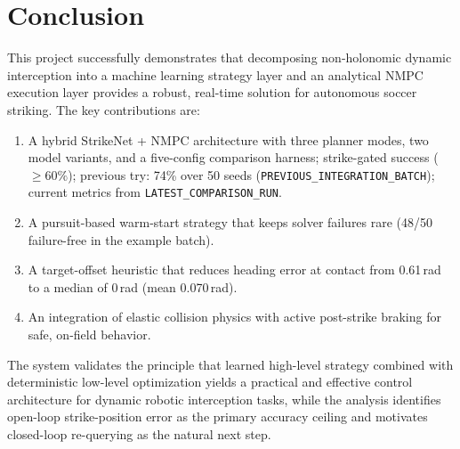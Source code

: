 \documentclass[10pt,twocolumn,letterpaper]{article}
\begin{document}
\section{Conclusion}

This project successfully demonstrates that decomposing non-holonomic
dynamic interception into a machine learning strategy layer and an
analytical NMPC execution layer provides a robust, real-time solution
for autonomous soccer striking. The key contributions are:
\begin{enumerate}
    \item A hybrid StrikeNet + NMPC architecture with three planner modes,
      two model variants, and a five-config comparison harness;
      strike-gated success ($\geq 60\%$); previous try: 74\% over 50 seeds
      (\texttt{PREVIOUS\_INTEGRATION\_BATCH}); current metrics from
      \texttt{LATEST\_COMPARISON\_RUN}.
    \item A pursuit-based warm-start strategy that keeps solver failures
      rare (48/50 failure-free in the example batch).
    \item A target-offset heuristic that reduces heading error at
      contact from 0.61\,rad to a median of 0\,rad (mean 0.070\,rad).
    \item An integration of elastic collision physics with active
      post-strike braking for safe, on-field behavior.
\end{enumerate}
The system validates the principle that learned high-level strategy
combined with deterministic low-level optimization yields a practical
and effective control architecture for dynamic robotic interception
tasks, while the analysis identifies open-loop strike-position error as
the primary accuracy ceiling and motivates closed-loop re-querying as
the natural next step.
\end{document}
